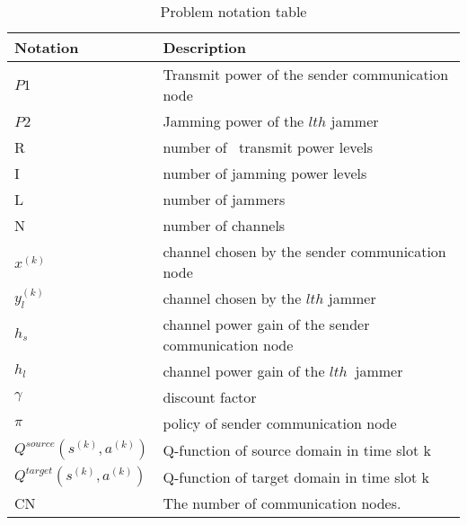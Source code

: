 \documentclass[letterpaper%
, twoside%
, 12pt%
,thesepararticles%
, english%
,creativecommons,hyperref, withAlgo2e%
]{thETS}
\begin{document}
\begin{table}[!h]
        \centering
        
        \parbox{0.65\textwidth}{\caption{Problem notation table}\label{tab:testAp}}
        
\begin{tabular}{|p{}|p{}|}
\hline 
 Notation & Description \\
\hline 
 $\displaystyle P1$ & Transmit power of the sender communication node \\
\hline 
 $\displaystyle P$2 & Jamming power of the $\displaystyle lth$ jammer \\
\hline 
 R & number of \ transmit power levels \\
\hline 
 I & number of jamming power levels \\
\hline 
 L & number of jammers \\
\hline 
 N  & number of channels \\
\hline 
 $\displaystyle x^{( k)}$ & channel chosen by the sender communication node \\
\hline 
 $\displaystyle y_{l}^{( k)}$ & channel chosen by the $\displaystyle lth$ jammer \\
\hline 
 $\displaystyle h_{s}$ & channel power gain of the sender communication node \\
\hline 
 $\displaystyle h_{l}$ & channel power gain of the $\displaystyle lth\ $ jammer \\
\hline 
 $\displaystyle \gamma $ & discount factor \\
\hline 
 $\displaystyle \pi $ & policy of sender communication node \\
\hline 
 $\displaystyle Q^{source}\left( s^{( k)} ,a^{( k)}\right)$ & Q-function of source domain in time slot k \\
\hline 
 $\displaystyle Q^{target}\left( s^{( k)} ,a^{( k)}\right)$ & Q-function of target domain in time slot k \\
\hline 
 CN & The number of communication nodes. \\
 \hline
\end{tabular}
        
 \end{table}
 
\end{document}
